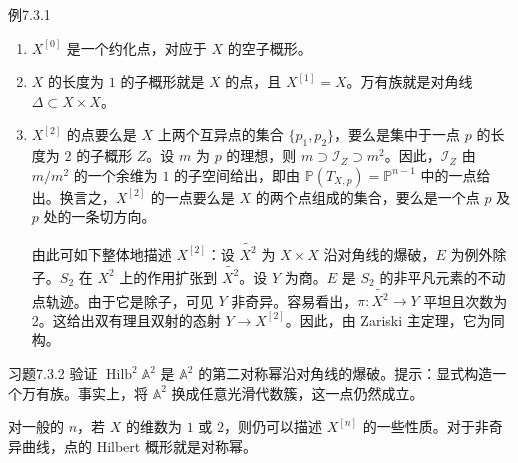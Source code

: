 \begin{origstatement}{例}{7.3.1}\label{ch07:7.3.1}
\begin{enumerate}[label=(\arabic*)]
\item $X^{[0]}$ 是一个约化点，对应于 $X$ 的空子概形。
\item $X$ 的长度为 $1$ 的子概形就是 $X$ 的点，且 $X^{[1]}=X$。万有族就是对角线 $\Delta\subset X\times X$。
\item $X^{[2]}$ 的点要么是 $X$ 上两个互异点的集合 $\{p_1,p_2\}$，要么是集中于一点 $p$ 的长度为 $2$ 的子概形 $Z$。设 $m$ 为 $p$ 的理想，则 $m\supset\mathcal I_Z\supset m^2$。因此，$\mathcal I_Z$ 由 $m/m^2$ 的一个余维为 $1$ 的子空间给出，即由 $\mathbb P(T_{X,p})=\mathbb P^{n-1}$ 中的一点给出。换言之，$X^{[2]}$ 的一点要么是 $X$ 的两个点组成的集合，要么是一个点 $p$ 及 $p$ 处的一条切方向。

由此可如下整体地描述 $X^{[2]}$：设 $\widetilde{X^2}$ 为 $X\times X$ 沿对角线的爆破，$E$ 为例外除子。$S_2$ 在 $X^2$ 上的作用扩张到 $\widetilde{X^2}$。设 $Y$ 为商。$E$ 是 $S_2$ 的非平凡元素的不动点轨迹。由于它是除子，可见 $Y$ 非奇异。容易看出，$\pi:\widetilde{X^2}\to Y$ 平坦且次数为 $2$。这给出双有理且双射的态射 $Y\to X^{[2]}$。因此，由 Zariski 主定理，它为同构。
\end{enumerate}
\end{origstatement}
\begin{origstatement}{习题}{7.3.2}\label{ch07:7.3.2}
验证 $\operatorname{Hilb}^2\mathbb A^2$ 是 $\mathbb A^2$ 的第二对称幂沿对角线的爆破。提示：显式构造一个万有族。事实上，将 $\mathbb A^2$ 换成任意光滑代数簇，这一点仍然成立。
\end{origstatement}
对一般的 $n$，若 $X$ 的维数为 $1$ 或 $2$，则仍可以描述 $X^{[n]}$ 的一些性质。对于非奇异曲线，点的 Hilbert 概形就是对称幂。

